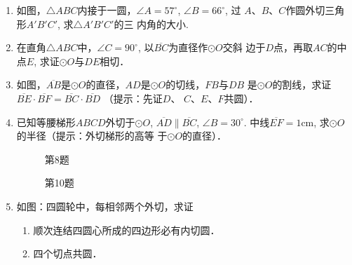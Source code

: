 \begin{enumerate}
  \item 如图，$\triangle ABC$内接于一圆，$\angle A=57^{\circ}$, $\angle B=66^{\circ}$, 过
$A$、$B$、$C$作圆外切三角形$A'B'C'$, 求$\triangle A'B'C'$的三
内角的大小.
\item 在直角$\triangle ABC$中，$\angle C=90^{\circ}$, 以$\overline{BC}$为直径作$\odot O$交斜
边于$D$点，再取$AC$的中点$E$, 求证$\odot O$与$DE$相切．
\item 如图，$\overline{AB}$是$\odot O$的直径，$AD$是$\odot O$的切线，$FB$与$DB$
是$\odot O$的割线，求证
$\overline{BE}\cdot \overline{BF}=\overline{BC}\cdot\overline{BD}$ （提示：先证$D$、
$C$、$E$、$F$共圆）．
\item 已知等腰梯形$ABCD$外切于$\odot O$, $\overline{AD}\parallel \overline{BC}$, $\angle B=30^{\circ}$. 
中线$\overline{EF}=1$cm, 求$\odot O$的半径（提示：外切梯形的高等
于$\odot O$的直径）．

\begin{figure}[htp]\centering
  \begin{minipage}[t]{0.48\textwidth}
  \centering
{}
  \caption*{第8题}
  \end{minipage}
  \begin{minipage}[t]{0.48\textwidth}
  \centering
  \caption*{第10题}
  \end{minipage}
  \end{figure}

  \item  如图：四圆轮中，每相邻两个外切，求证
\begin{enumerate}
  \item 顺次连结四圆心所成的四边形必有内切圆．
  \item 四个切点共圆．
\end{enumerate}


\end{enumerate}
